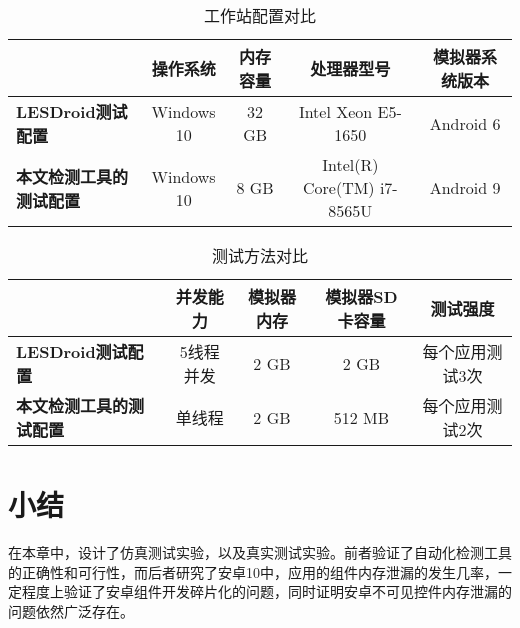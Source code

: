 \begin{table}[htb]\footnotesize
	\centering
	\caption{工作站配置对比}
	\vspace{2mm}
	\begin{tabular}{lcccc}
		\toprule
		&\textbf{操作系统}&\textbf{内存容量}&\textbf{处理器型号}&\textbf{模拟器系统版本}\\
		\midrule
		\textbf{LESDroid测试配置\cite{jun2018lesdroid}}&Windows 10&32 GB&Intel Xeon E5-1650&Android 6\\
		\hline
		\textbf{本文检测工具的测试配置}&Windows 10&8 GB&Intel(R) Core(TM) i7-8565U&Android 9\\
		\bottomrule
	\end{tabular}
	\label{table:pc-compare}
\end{table}

\begin{table}[htb]\footnotesize
	\centering
	\caption{测试方法对比}
	\vspace{2mm}
	\begin{tabular}{lcccc}
		\toprule
		&\textbf{并发能力}&\textbf{模拟器内存}&\textbf{模拟器SD卡容量}&\textbf{测试强度}\\
		\midrule
		\textbf{LESDroid测试配置\cite{jun2018lesdroid}}&5线程并发&2 GB&2 GB&每个应用测试3次\\
		\hline
		\textbf{本文检测工具的测试配置}&单线程&2 GB&512 MB&每个应用测试2次\\
		\bottomrule
	\end{tabular}
	\label{table:method-compare}
\end{table}

\section{小结}
在本章中，设计了仿真测试实验，以及真实测试实验。前者验证了自动化检测工具的正确性和可行性，而后者研究了安卓10中，应用的组件内存泄漏的发生几率，一定程度上验证了安卓组件开发碎片化的问题，同时证明安卓不可见控件内存泄漏的问题依然广泛存在。